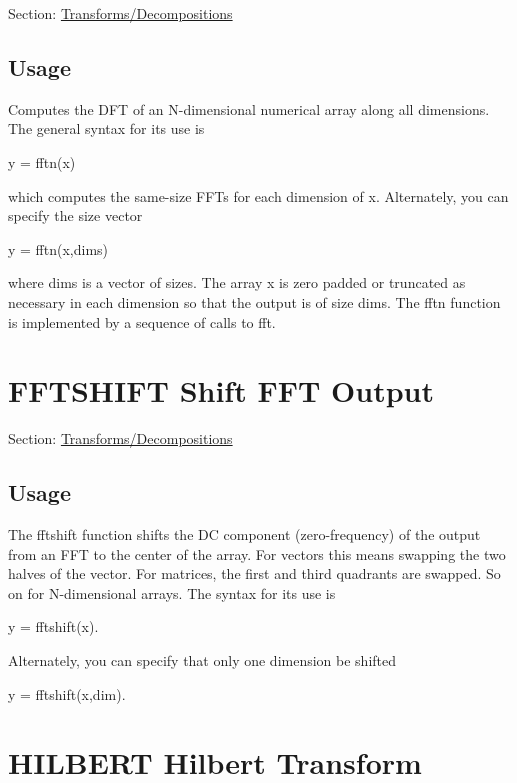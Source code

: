 Section\-: \hyperlink{sec_transforms}{Transforms/\-Decompositions} \hypertarget{vtkwidgets_vtkxyplotwidget_Usage}{}\subsection{Usage}\label{vtkwidgets_vtkxyplotwidget_Usage}
Computes the D\-F\-T of an N-\/dimensional numerical array along all dimensions. The general syntax for its use is \begin{DoxyVerb}  y = fftn(x)
\end{DoxyVerb}
 which computes the same-\/size F\-F\-Ts for each dimension of {\ttfamily x}. Alternately, you can specify the size vector \begin{DoxyVerb}  y = fftn(x,dims)
\end{DoxyVerb}
 where {\ttfamily dims} is a vector of sizes. The array {\ttfamily x} is zero padded or truncated as necessary in each dimension so that the output is of size {\ttfamily dims}. The {\ttfamily fftn} function is implemented by a sequence of calls to {\ttfamily fft}. \hypertarget{transforms_fftshift}{}\section{F\-F\-T\-S\-H\-I\-F\-T Shift F\-F\-T Output}\label{transforms_fftshift}
Section\-: \hyperlink{sec_transforms}{Transforms/\-Decompositions} \hypertarget{vtkwidgets_vtkxyplotwidget_Usage}{}\subsection{Usage}\label{vtkwidgets_vtkxyplotwidget_Usage}
The {\ttfamily fftshift} function shifts the D\-C component (zero-\/frequency) of the output from an F\-F\-T to the center of the array. For vectors this means swapping the two halves of the vector. For matrices, the first and third quadrants are swapped. So on for N-\/dimensional arrays. The syntax for its use is \begin{DoxyVerb}     y = fftshift(x).
\end{DoxyVerb}
 Alternately, you can specify that only one dimension be shifted \begin{DoxyVerb}     y = fftshift(x,dim).
\end{DoxyVerb}
 \hypertarget{transforms_hilbert}{}\section{H\-I\-L\-B\-E\-R\-T Hilbert Transform}\label{transforms_hilbert}
